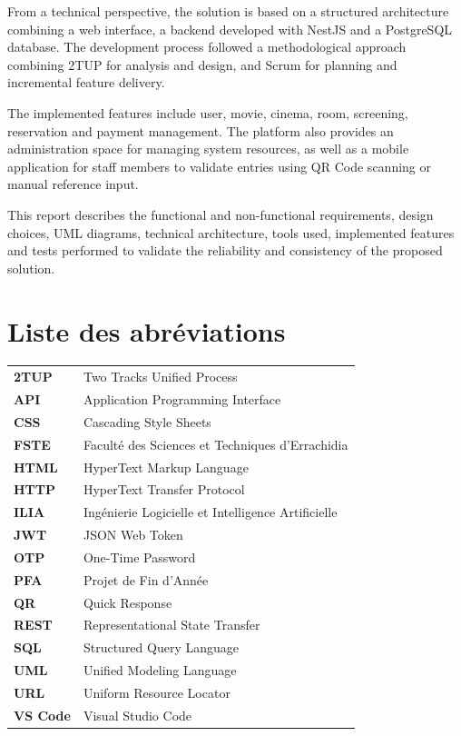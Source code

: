 \documentclass[12pt]{report}
\begin{document}
From a technical perspective, the solution is based on a structured architecture
combining a web interface, a backend developed with NestJS and a PostgreSQL
database. The development process followed a methodological approach combining
2TUP for analysis and design, and Scrum for planning and incremental feature
delivery.

The implemented features include user, movie, cinema, room, screening,
reservation and payment management. The platform also provides an administration
space for managing system resources, as well as a mobile application for staff
members to validate entries using QR Code scanning or manual reference input.

This report describes the functional and non-functional requirements, design
choices, UML diagrams, technical architecture, tools used, implemented features
and tests performed to validate the reliability and consistency of the proposed
solution.

\newpage

\tableofcontents
\newpage

\listoffigures
\newpage

\chapter*{Liste des abréviations}
{}

\begin{tabularx}{\textwidth}{>{\bfseries}p{3cm}X}
2TUP & Two Tracks Unified Process \\
API & Application Programming Interface \\
CSS & Cascading Style Sheets \\
FSTE & Faculté des Sciences et Techniques d'Errachidia \\
HTML & HyperText Markup Language \\
HTTP & HyperText Transfer Protocol \\
ILIA & Ingénierie Logicielle et Intelligence Artificielle \\
JWT & JSON Web Token \\
OTP & One-Time Password \\
PFA & Projet de Fin d'Année \\
QR & Quick Response \\
REST & Representational State Transfer \\
SQL & Structured Query Language \\
UML & Unified Modeling Language \\
URL & Uniform Resource Locator \\
VS Code & Visual Studio Code \\
\end{tabularx}
\end{document}
